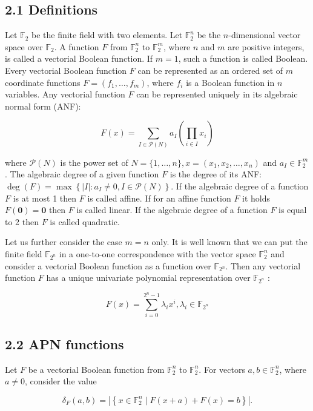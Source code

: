 \documentclass[10pt]{article}
\begin{document}
\subsection*{2.1 Definitions}
Let $\mathbb{F}_{2}$ be the finite field with two elements. Let $\mathbb{F}_{2}^{n}$ be the $n$-dimensional vector space over $\mathbb{F}_{2}$. A function $F$ from $\mathbb{F}_{2}^{n}$ to $\mathbb{F}_{2}^{m}$, where $n$ and $m$ are positive integers, is called a vectorial Boolean function. If $m=1$, such a function is called Boolean. Every vectorial Boolean function $F$ can be represented as an ordered set of $m$ coordinate functions $F=\left(f_{1}, \ldots, f_{m}\right)$, where $f_{i}$ is a Boolean function in $n$ variables. Any vectorial function $F$ can be represented uniquely in its algebraic normal form (ANF):

$$
F(x)=\sum_{I \in \mathcal{P}(N)} a_{I}\left(\prod_{i \in I} x_{i}\right)
$$

where $\mathcal{P}(N)$ is the power set of $N=\{1, \ldots, n\}, x=\left(x_{1}, x_{2}, \ldots, x_{n}\right)$ and $a_{I} \in \mathbb{F}_{2}^{m}$. The algebraic degree of a given function $F$ is the degree of its ANF: $\operatorname{deg}(F)=\max \left\{|I|: a_{I} \neq 0, I \in \mathcal{P}(N)\right\}$. If the algebraic degree of a function $F$ is at most 1 then $F$ is called affine. If for an affine function $F$ it holds $F(\mathbf{0})=\mathbf{0}$ then $F$ is called linear. If the algebraic degree of a function $F$ is equal to 2 then $F$ is called quadratic.

Let us further consider the case $m=n$ only. It is well known that we can put the finite field $\mathbb{F}_{2^{n}}$ in a one-to-one correspondence with the vector space $\mathbb{F}_{2}^{n}$ and consider a vectorial Boolean function as a function over $\mathbb{F}_{2^{n}}$. Then any vectorial function $F$ has a unique univariate polynomial representation over $\mathbb{F}_{2^{n}}$ :

$$
F(x)=\sum_{i=0}^{2^{n}-1} \lambda_{i} x^{i}, \lambda_{i} \in \mathbb{F}_{2^{n}}
$$

\subsection*{2.2 APN functions}
Let $F$ be a vectorial Boolean function from $\mathbb{F}_{2}^{n}$ to $\mathbb{F}_{2}^{n}$. For vectors $a, b \in \mathbb{F}_{2}^{n}$, where $a \neq 0$, consider the value

$$
\delta_{F}(a, b)=\left|\left\{x \in \mathbb{F}_{2}^{n} \mid F(x+a)+F(x)=b\right\}\right| .
$$
\end{document}
